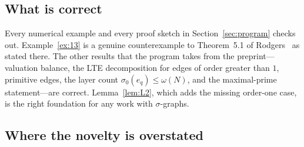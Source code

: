 \documentclass[11pt]{article}
\theoremstyle{definition}
\theoremstyle{remark}
\begin{document}
\subsection{What is correct}

Every numerical example and every proof sketch in Section~\ref{sec:program} checks out.
Example~\ref{ex:13} is a genuine counterexample to Theorem~5.1 of
Rodgers~\cite{Rodgers} as stated there.  The other results that the program
takes from the preprint---valuation balance, the LTE decomposition for edges
of order greater than $1$, primitive edges, the layer count
$\sigma_0(e_q)\le\omega(N)$, and the maximal-prime statement---are correct.
Lemma~\ref{lem:L2}, which adds the missing order-one case, is the right
foundation for any work with $\sigma$-graphs.

\subsection{Where the novelty is overstated}
\end{document}
